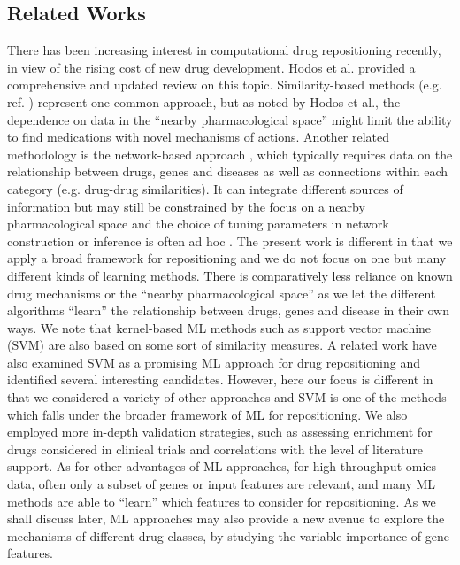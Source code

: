   \subsection{Related Works}
    There has been increasing interest in computational drug repositioning recently, in view of the rising cost of new drug development. Hodos et al. \cite{hodos2016silico} provided a comprehensive and updated review on this topic. Similarity-based methods (e.g. ref. \cite{gottlieb2011predict,oh2014network,liu2015similarity,luo2016drug,napolitano2013drug,li2012new}) represent one common approach, but as noted by Hodos et al., the dependence on data in the “nearby pharmacological space” might limit the ability to find medications with novel mechanisms of actions. Another related methodology is the network-based approach \cite{lotfi2018review}, which typically requires data on the relationship between drugs, genes and diseases as well as connections within each category (e.g. drug-drug similarities). It can integrate different sources of information but may still be constrained by the focus on a nearby pharmacological space and the choice of tuning parameters in network construction or inference is often ad hoc \cite{hodos2016silico}. The present work is different in that we apply a broad framework for repositioning and we do not focus on one but many different kinds of learning methods. There is comparatively less reliance on known drug mechanisms or the “nearby pharmacological space” as we let the different algorithms “learn” the relationship between drugs, genes and disease in their own ways. We note that kernel-based ML methods such as support vector machine (SVM) are also based on some sort of similarity measures. A related work \cite{napolitano2013drug} have also examined SVM as a promising ML approach for drug repositioning and identified several interesting candidates. However, here our focus is different in that we considered a variety of other approaches and SVM is one of the methods which falls under the broader framework of ML for repositioning. We also employed more in-depth validation strategies, such as assessing enrichment for drugs considered in clinical trials and correlations with the level of literature support. As for other advantages of ML approaches, for high-throughput omics data, often only a subset of genes or input features are relevant, and many ML methods are able to “learn” which features to consider for repositioning. As we shall discuss later, ML approaches may also provide a new avenue to explore the mechanisms of different drug classes, by studying the variable importance of gene features.

